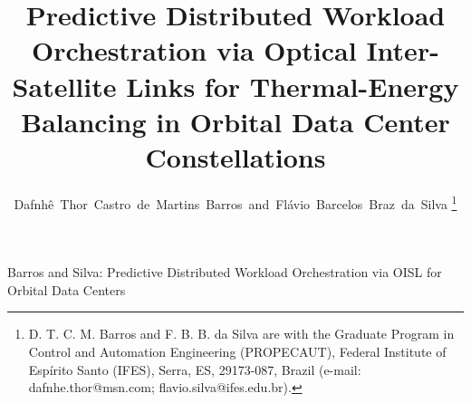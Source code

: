\documentclass[journal]{IEEEtran}
\begin{document}
\title{Predictive Distributed Workload Orchestration via Optical Inter-Satellite Links for Thermal-Energy Balancing in Orbital Data Center Constellations}

\author{Dafnh\^{e}~Thor~Castro~de~Martins~Barros~and~Fl\'{a}vio~Barcelos~Braz~da~Silva%
\thanks{D. T. C. M. Barros and F. B. B. da Silva are with the Graduate Program in Control and Automation Engineering (PROPECAUT), Federal Institute of Esp\'{i}rito Santo (IFES), Serra, ES, 29173-087, Brazil (e-mail: dafnhe.thor@msn.com; flavio.silva@ifes.edu.br).}}

\markboth{}%
{Barros and Silva: Predictive Distributed Workload Orchestration via OISL for Orbital Data Centers}

\maketitle
\end{document}
